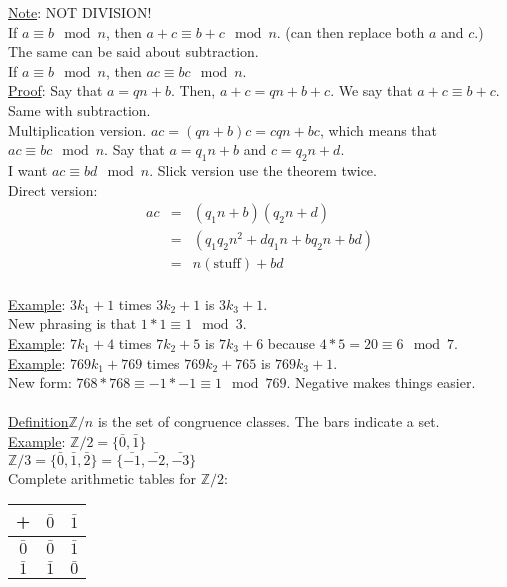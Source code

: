 \documentclass[13pt]{article}
\begin{document}
	\underline{Note}: NOT DIVISION!\\
	If $a \equiv b \mod n$, then $a + c \equiv b + c \mod n$. (can then
	replace both $a$ and $c$.)\\
	The same can be said about subtraction.\\
	If $a \equiv b \mod n$, then $ac \equiv bc \mod n$.\\
	\underline{Proof}: Say that $a = qn + b$. Then, $a+c = qn + b + c$. We say
	that $a + c \equiv b + c$.\\
	Same with subtraction.\\
	Multiplication version. $ac = (qn + b)c = cqn + bc$, which means that
	$ac \equiv bc \mod n$.
	Say that $a = q_1n + b$ and $c = q_2n + d$.\\
	I want $ac \equiv bd \mod n$. Slick version use the theorem twice. \\
	Direct version: 
	\begin{eqnarray*}
		ac & = & (q_1n +b)(q_2n + d)\\
		& = & (q_1q_2n^2 + dq_1n + bq_2n + bd)\\
		& = & n(\text{stuff}) + bd
	\end{eqnarray*}\\
	\underline{Example}: $3k_1 + 1$ times $3k_2 + 1$ is $3k_3 + 1$.\\
	New phrasing is that $1 * 1 \equiv 1 \mod 3$.\\
	\underline{Example}: $7k_1 + 4$ times $7k_2 + 5$ is $7k_3 + 6$ because
	$4* 5 = 20 \equiv 6 \mod 7$.\\
	\underline{Example}: $769k_1 + 769$ times $769k_2 + 765$ is $769k_3 + 1$.\\
	New form: $768 * 768 \equiv -1 * -1 \equiv 1 \mod 769$. Negative makes 
	things easier. \\\\
	\underline{Definition}$\mathbb{Z}/n$ is the set of congruence classes. The
	bars indicate a set.\\
	\underline{Example}: $\mathbb{Z}/2 = \{\bar{0}, \bar{1}\}$ \\
	$\mathbb{Z}/ 3 = \{\bar{0}, \bar{1}, \bar{2}\} = \{\bar{-1}, \bar{-2}, 
	\bar{-3}\}$\\
	Complete arithmetic tables for $\mathbb{Z} / 2$:
	\begin{tabular}{|c || c | c|}
		\hline
		+ &$ \bar{0} $&$ \bar{1}$\\
		\hline
		\hline
		$\bar{0} $&$ \bar{0} $&$ \bar{1}$ \\
		\hline
		$\bar{1} $&$ \bar{1} $&$ \bar{0} $\\
		\hline
	\end{tabular}\\
\end{document}
